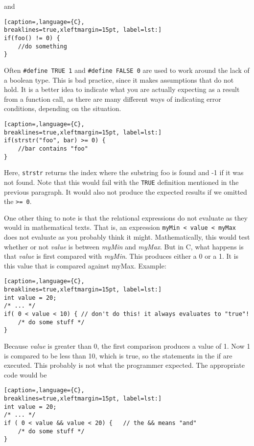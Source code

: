 and
\lstset{basicstyle=\scriptsize, numbers=left, captionpos=b, tabsize=4}
\begin{lstlisting}[caption=,language={C},
breaklines=true,xleftmargin=15pt, label=lst:]
if(foo() != 0) {
	//do something
}
\end{lstlisting}

Often \texttt{\#define TRUE 1} and \texttt{\#define FALSE 0} are used to work
around the lack of a boolean type. This is bad practice, since it makes
assumptions that do not hold. It is a better idea to indicate what you are
actually expecting as a result from a function call, as there are many
different ways of indicating error conditions, depending on the situation.
\lstset{basicstyle=\scriptsize, numbers=left, captionpos=b, tabsize=4}
\begin{lstlisting}[caption=,language={C},
breaklines=true,xleftmargin=15pt, label=lst:]
if(strstr("foo", bar) >= 0) {
	//bar contains "foo"
}
\end{lstlisting}

Here, \texttt{strstr} returns the index where the substring foo is found and -1
if it was not found. Note that this would fail with the \texttt{TRUE}
definition mentioned in the previous paragraph. It would also not produce the
expected results if we omitted the \texttt{\textgreater{}= 0}.

One other thing to note is that the relational expressions do not evaluate as
they would in mathematical texts. That is, an expression \texttt{myMin
\textless{} value \textless{} myMax} does not evaluate as you probably think it
might. Mathematically, this would test whether or not \emph{value} is between
\emph{myMin} and \emph{myMax}. But in C, what happens is that \emph{value} is
first compared with \emph{myMin}. This produces either a 0 or a 1. It is this
value that is compared against myMax. Example:
\lstset{basicstyle=\scriptsize, numbers=left, captionpos=b, tabsize=4}
\begin{lstlisting}[caption=,language={C},
breaklines=true,xleftmargin=15pt, label=lst:]
int value = 20;
/* ... */
if( 0 < value < 10) { // don't do this! it always evaluates to "true"!
	/* do some stuff */
}
\end{lstlisting}

Because \emph{value} is greater than 0, the first comparison produces a value
of 1. Now 1 is compared to be less than 10, which is true, so the statements in
the if are executed. This probably is not what the programmer expected. The
appropriate code would be
\lstset{basicstyle=\scriptsize, numbers=left, captionpos=b, tabsize=4}
\begin{lstlisting}[caption=,language={C},
breaklines=true,xleftmargin=15pt, label=lst:]
int value = 20;
/* ... */
if ( 0 < value && value < 20) {   // the && means "and"
	/* do some stuff */
}
\end{lstlisting}

